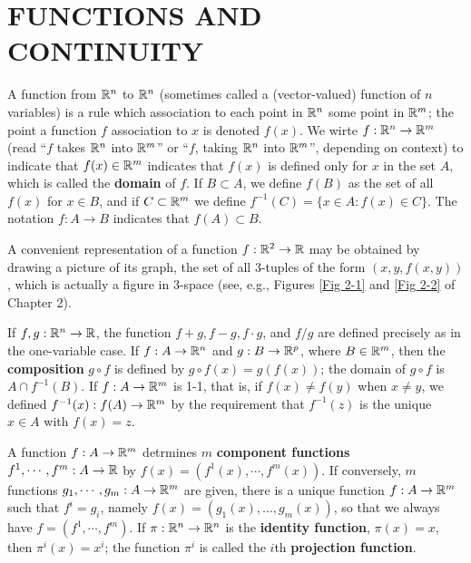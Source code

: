 \clearpage
\section{FUNCTIONS AND CONTINUITY}
A function from $\mathbb{R}^n$ to $\mathbb{R}^n$ (sometimes called a (vector-valued) function of $n$ variables)
is a rule which association to each point in $\mathbb{R}^n$ some point in $\mathbb{R}^m$;
the point a function $f$ association to $x$ is denoted $f(x)$.
We wirte $f:\mathbb{R}^n\to \mathbb{R}^m$ (read ``$f$ takes $\mathbb{R}^n$ into $\mathbb{R}^m$'' or ``$f$, taking
$\mathbb{R}^n$ into $\mathbb{R}^m$'', depending on context) to indicate that $f(x)\in \mathbb{R}^m$ 
indicates that $f(x)$ is defined only for $x$ in the set $A$, which is called the \textbf{domain}
of $f$. If $B\subset A$, we define $f(B)$ as the set of all $f(x)$ for $x\in B$, and if $C\subset \mathbb{R}^m$
we define $f^{-1}(C) = \{x\in A:f(x)\in C\}$. 
The notation $f:A\to B$ indicates that $f(A)\subset B$.

A convenient representation of a function $f: \mathbb{R}^2 \to \mathbb{R}$ may
be obtained by drawing a picture of its graph, the set of all
3-tuples of the form $(x,y,f(x,y))$, which is actually a figure in
3-space (see, e.g., Figures \ref{Fig 2-1} and \ref{Fig 2-2} of Chapter 2).

If $f, g:\mathbb{R}^n \to \mathbb{R}$, the function $f+g, f-g, f\cdot g$, and $f/g$ are defined 
precisely as in the one-variable case. If $f:A\to \mathbb{R}^n$ and $g:B\to \mathbb{R}^p$, where 
$B\in \mathbb{R}^m$, then the \textbf{composition} $g\circ f$ is defined by $g\circ f(x)=g(f(x))$;
the domain of $g\circ f$ is $A\cap f^{-1}(B)$. If $f:A\to \mathbb{R}^m$ is 1-1, that is, if 
$f(x)\neq f(y)$ when $x\neq y$, we defined $f^{-1}(x):f(A)\to \mathbb{R}^m$ by the requirement 
that $f^{-1}(z)$ is the unique $x\in A$ with $f(x) = z$.

A function $f:A\to \mathbb{R}^m$ detrmines $m$ \textbf{component functions} $f^1, \cdots, f^m:A\to \mathbb{R}$
by $f(x) = \left(f^1(x), \cdots, f^m(x)\right)$. If conversely, $m$ functions $g_1, \cdots, g_m:A\to \mathbb{R}^m$
are given, there is a unique function $f:A\to \mathbb{R}^m$ such that $f^i = g_i$, 
namely $f(x) = \left(g_1(x), \dots, g_m(x)\right)$, so that we always have $f=\left(f^1, \cdots, f^m\right)$.
If $\pi: \mathbb{R}^n\to \mathbb{R}^n$ is the \textbf{identity function}, 
$\pi(x) = x$, then $\pi^i(x) = x^i$; the function $\pi^i$ is called the $i$th \textbf{projection function}.

